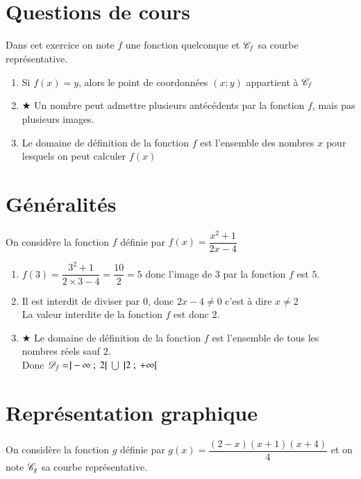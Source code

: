\documentclass[oneside,12pt]{exam}          %
\begin{document}
\newpage
\setcounter{section}{0}
\color{newblue}


\section{Questions de cours}
Dans cet exercice on note $f$ une fonction quelconque et ${\mathscr{C}}_f$ sa courbe représentative.
\begin{enumerate}
	\item Si $f(x)=y$, alors le point de coordonnées $(x;y)$ appartient à ${\mathscr{C}}_f$
	\item $\bigstar$ Un nombre peut admettre plusieurs antécédents par la fonction $f$, mais pas plusieurs images.
	\item Le domaine de définition de la fonction $f$ est l'ensemble des nombres $x$ pour lesquels on peut calculer $f(x)$
\end{enumerate}



\section{Généralités}
On considère la fonction $f$ définie par $f(x) = \dfrac{x^2 + 1}{2x - 4}$
\begin{enumerate}
	\item $f(3) = \dfrac{3^2 + 1}{2 \times 3 - 4} = \dfrac{10}{2} = 5$ \quad donc l'image de $3$ par la fonction $f$ est $5$.
	\item Il est interdit de diviser par $0$, donc $2x - 4 \neq 0$ c'est à dire $x \neq 2$ \\
	La valeur interdite de la fonction $f$ est donc $2$.
	\item $\bigstar$ Le domaine de définition de la fonction $f$ est l'ensemble de tous les nombres réels sauf $2$. \\
	Donc ${\mathscr{D}}_f = ]-\infty ~;~ 2[ \,\,\bigcup\,\, ]2 ~;~ +\infty[$
\end{enumerate}



\section{Représentation graphique}
On considère la fonction $g$ définie par $g(x) = \dfrac{(2-x)(x+1)(x+4)}{4}$ et on note ${\mathscr{C}}_g$ sa courbe représentative.
\end{document}
